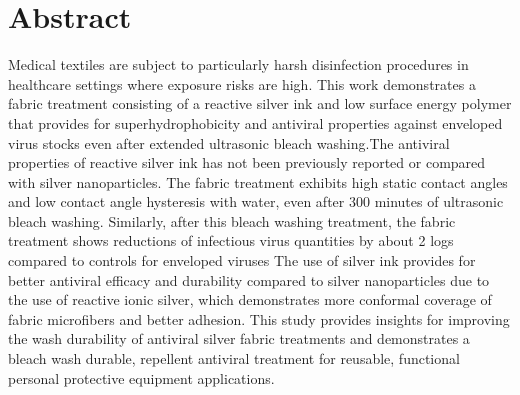 \documentclass[10pt,letterpaper]{article}
\begin{document}
\begin{flushleft}
 \setlength {\marginparwidth }{2cm}


\end{flushleft}

\section*{Abstract}
Medical textiles are subject to particularly harsh disinfection procedures 
in healthcare settings where exposure risks are high.  
This work demonstrates a fabric treatment consisting of 
a reactive silver ink and low surface energy polymer that 
provides for 
superhydrophobicity and antiviral properties against enveloped virus stocks 
even after extended ultrasonic bleach washing.The antiviral properties of reactive silver ink has not been previously reported or compared with silver nanoparticles.
The fabric treatment 
exhibits high static contact angles and low contact angle hysteresis with water, even after 300 minutes of ultrasonic bleach washing. Similarly, after this bleach washing treatment, the fabric treatment shows reductions of infectious virus quantities by about 2 logs compared to controls for enveloped viruses The use of silver ink provides for 
better antiviral efficacy and durability compared to silver nanoparticles due to the use of reactive ionic silver, which demonstrates more conformal coverage of fabric microfibers and better %
adhesion.  This study provides insights for improving the wash durability of antiviral silver fabric treatments and demonstrates a bleach wash durable, repellent antiviral treatment for reusable, functional personal protective equipment applications. 
\end{document}
